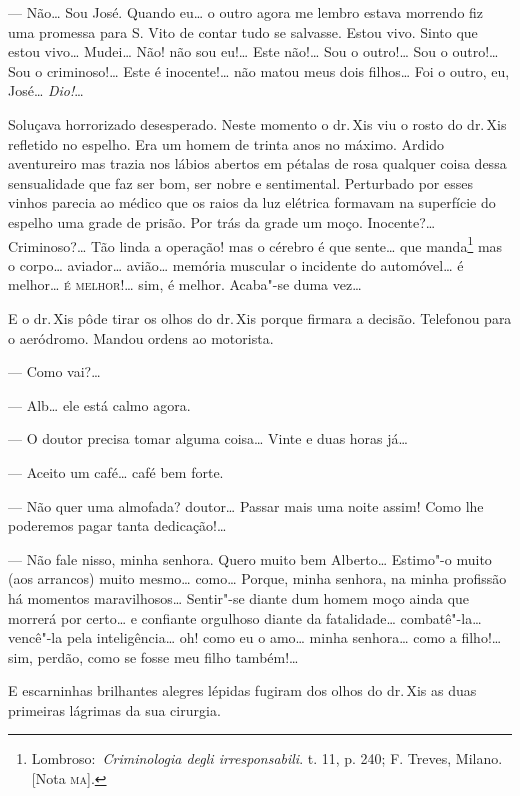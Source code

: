 --- Não\ldots{} Sou José. Quando eu\ldots{} o outro agora me lembro estava
morrendo fiz uma promessa para S. Vito de contar tudo se salvasse. Estou
vivo. Sinto que estou vivo\ldots{} Mudei\ldots{} Não! não sou eu!\ldots{} Este não!\ldots{}
Sou o outro!\ldots{} Sou o outro!\ldots{} Sou o criminoso!\ldots{} Este é inocente!\ldots{}
não matou meus dois filhos\ldots{} Foi o outro, eu, José\ldots{} \emph{Dio!}\ldots{}

Soluçava horrorizado desesperado. Neste momento o dr.\,Xis viu o rosto do
dr.\,Xis refletido no espelho. Era um homem de trinta anos no máximo.
Ardido aventureiro mas trazia nos lábios abertos em pétalas de rosa
qualquer coisa dessa sensualidade que faz ser bom, ser nobre e
sentimental. Perturbado por esses vinhos parecia ao médico que os raios
da luz elétrica formavam na superfície do espelho uma grade de prisão.
Por trás da grade um moço. Inocente?\ldots{} Criminoso?\ldots{} Tão linda a
operação! mas o cérebro é que sente\ldots{} que manda\footnote{Lombroso:~\emph{Criminologia
  degli irresponsabili}. t. 11, p. 240; F. Treves, Milano. {[}Nota
  \textsc{ma}{]}.} mas o corpo\ldots{} aviador\ldots{} avião\ldots{} memória muscular o
incidente do automóvel\ldots{} é melhor\ldots{} \textsc{é melhor}!\ldots{} sim, é melhor.
Acaba"-se duma vez\ldots{}

E o dr.\,Xis pôde tirar os olhos do dr.\,Xis porque firmara a decisão.
Telefonou para o aeródromo. Mandou ordens ao motorista.

--- Como vai?\ldots{}

--- Alb\ldots{} ele está calmo agora.

--- O doutor precisa tomar alguma coisa\ldots{} Vinte e duas horas já\ldots{}

--- Aceito um café\ldots{} café bem forte.

--- Não quer uma almofada? doutor\ldots{} Passar mais uma noite assim! Como
lhe poderemos pagar tanta dedicação!\ldots{}

--- Não fale nisso, minha senhora. Quero muito bem Alberto\ldots{} Estimo"-o
muito (aos arrancos) muito mesmo\ldots{} como\ldots{} Porque, minha senhora, na
minha profissão há momentos maravilhosos\ldots{} Sentir"-se diante dum homem
moço ainda que morrerá por certo\ldots{} e confiante orgulhoso diante da
fatalidade\ldots{} combatê"-la\ldots{} vencê"-la pela inteligência\ldots{} oh! como eu o
amo\ldots{} minha senhora\ldots{} como a filho!\ldots{} sim, perdão, como se fosse meu
filho também!\ldots{}

E escarninhas brilhantes alegres lépidas fugiram dos olhos do dr.\,Xis as
duas primeiras lágrimas da sua cirurgia.

